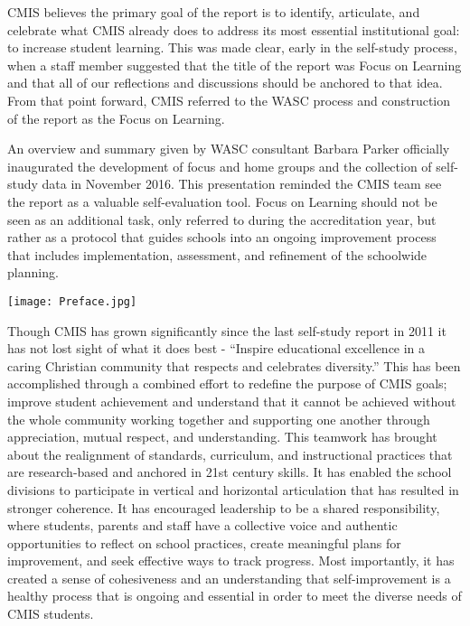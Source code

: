 CMIS believes the primary goal of the report is to identify, articulate, and celebrate what CMIS already does to address its most essential institutional goal: to increase student learning. This was made clear, early in the self-study process, when a staff member suggested that the title of the report was Focus on Learning and that all of our reflections and discussions should be anchored to that idea. From that point forward, CMIS referred to the WASC process and construction of the report as the Focus on Learning. 

An overview and summary given by WASC consultant Barbara Parker officially inaugurated the development of focus and home groups and the collection of self-study data in November 2016. This presentation reminded the CMIS team see the report as a valuable self-evaluation tool. Focus on Learning should not be seen as an additional task, only referred to during the accreditation year, but rather as a protocol that guides schools into an ongoing improvement process that includes implementation, assessment, and refinement of the schoolwide planning.

{\centering\texttt{[image: Preface.jpg]}}

Though CMIS has grown significantly since the last self-study report in 2011 it has not lost sight of what it does best - ``Inspire educational excellence in a caring Christian community that respects and celebrates diversity.'' This has been accomplished through a combined effort to redefine the purpose of CMIS goals; improve student achievement and understand that it cannot be achieved without the whole community working together and supporting one another through appreciation, mutual respect, and understanding. This teamwork has brought about the realignment of standards, curriculum, and instructional practices that are research-based and anchored in 21st century skills. It has enabled the school divisions to participate in vertical and horizontal articulation that has resulted in stronger coherence. It has encouraged leadership to be a shared responsibility, where students, parents and staff have a collective voice and authentic opportunities to reflect on school practices, create meaningful plans for improvement, and seek effective ways to track progress. Most importantly, it has created a sense of cohesiveness and an understanding that self-improvement is a healthy process that is ongoing and essential in order to meet the diverse needs of CMIS students.



